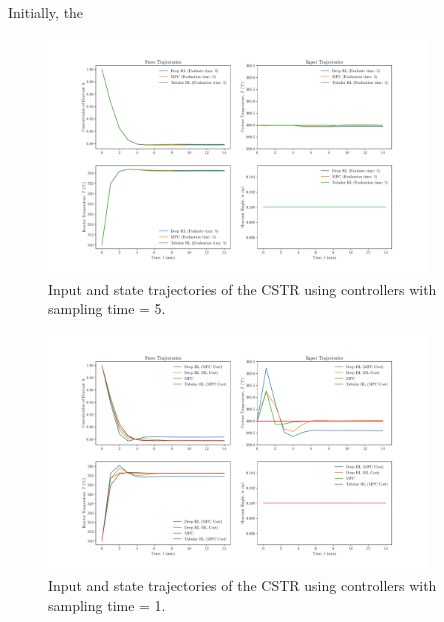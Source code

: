 Initially, the 
\begin{figure}[H]
    \centering
    \includegraphics[width=0.9\textwidth]{images/ch4/States_and_Inputs_5_CSTR.pdf}
    \caption{Input and state trajectories of the CSTR using controllers with sampling time = 5.}
    \label{fig:04CSTR_5}
\end{figure}

\begin{figure}[H]
    \centering
    \includegraphics[width=0.9\textwidth]{images/ch4/States_and_Inputs_1_CSTR.pdf}
    \caption{Input and state trajectories of the CSTR using controllers with sampling time = 1.}
    \label{fig:04CSTR_1}
\end{figure}

